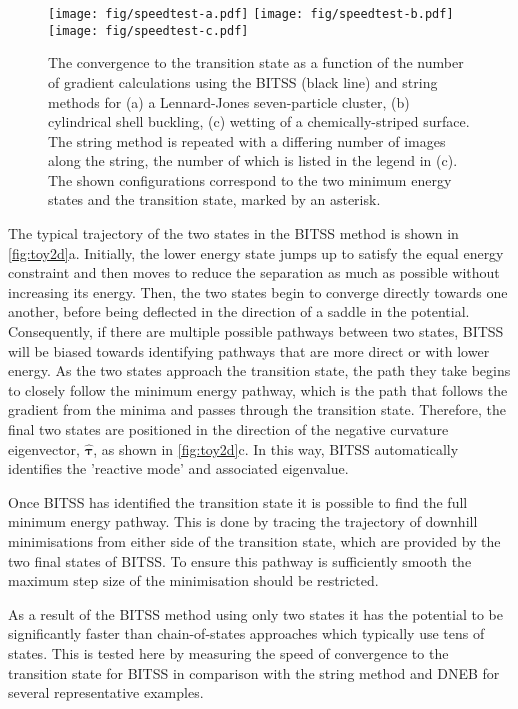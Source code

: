 \documentclass[aps,prl,twocolumn,groupedaddress]{revtex4}
\begin{document}
\begin{figure*}[tb]
  \texttt{[image: fig/speedtest-a.pdf]}%
  \texttt{[image: fig/speedtest-b.pdf]}%
  \texttt{[image: fig/speedtest-c.pdf]}%
  \caption{\label{fig:speedtest}
    The convergence to the transition state as a function of the number of gradient calculations using the BITSS (black line) and string methods for (a) a Lennard-Jones seven-particle cluster, (b) cylindrical shell buckling, (c) wetting of a chemically-striped surface.
    The string method is repeated with a differing number of images along the string, the number of which is listed in the legend in (c).
    The shown configurations correspond to the two minimum energy states and the transition state, marked by an asterisk.
  }
\end{figure*}

\topic The typical trajectory of the two states in the BITSS method is shown in \cref{fig:toy2d}a.
Initially, the lower energy state jumps up to satisfy the equal energy constraint and then moves to reduce the separation as much as possible without increasing its energy.
Then, the two states begin to converge directly towards one another, before being deflected in the direction of a saddle in the potential.
Consequently, if there are multiple possible pathways between two states, BITSS will be biased towards identifying pathways that are more direct or with lower energy.
As the two states approach the transition state, the path they take begins to closely follow the minimum energy pathway, which is the path that follows the gradient from the minima and passes through the transition state.
Therefore, the final two states are positioned in the direction of the negative curvature eigenvector, $\bm{\hat{\tau}}$, as shown in \cref{fig:toy2d}c.
In this way, BITSS automatically identifies the 'reactive mode' and associated eigenvalue.

\topic Once BITSS has identified the transition state it is possible to find the full minimum energy pathway.
This is done by tracing the trajectory of downhill minimisations from either side of the transition state, which are provided by the two final states of BITSS.
To ensure this pathway is sufficiently smooth the maximum step size of the minimisation should be restricted.


\topic As a result of the BITSS method using only two states it has the potential to be significantly faster than chain-of-states approaches which typically use tens of states.
This is tested here by measuring the speed of convergence to the transition state for BITSS in comparison with the string method and DNEB for several representative examples.
\end{document}
